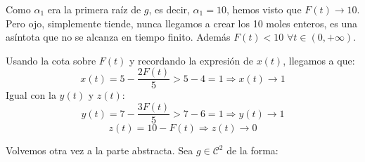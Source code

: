 \begin{example}
Como $\alpha_1$ era la primera raíz de $g$, es decir, $\alpha_1=10$, hemos visto que $F(t)\longrightarrow 10$. Pero ojo, simplemente tiende, nunca llegamos a crear los 10 moles enteros, es una asíntota que no se alcanza en tiempo finito. Además $F(t)<10$ $\forall t \in(0,+\infty)$.

Usando la cota sobre $F(t)$ y recordando la expresión de $x(t)$, llegamos a que:
\[
x(t)=5-\frac{2F(t)}{5}>5-4=1 \Rightarrow x(t)\longrightarrow 1
\]
Igual con la $y(t)$ y $z(t)$:
\[
y(t)=7-\frac{3F(t)}{5}>7-6=1 \Rightarrow y(t)\longrightarrow 1
\]
\[
z(t)=10-F(t) \Rightarrow z(t)\longrightarrow 0
\]

Volvemos otra vez a la parte abstracta. Sea $g\in\mathcal{C}^2$ de la forma:

\begin{center}
\end{center}


\end{example}
